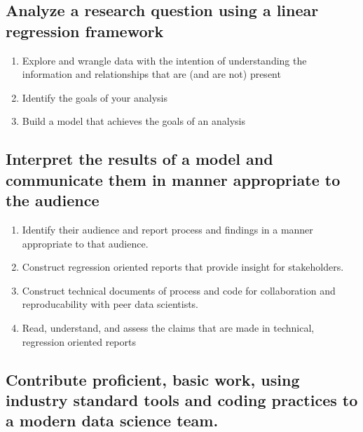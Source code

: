 \documentclass[
]{book}
\providecommand{\tightlist}{%
  \setlength{\itemsep}{0pt}\setlength{\parskip}{0pt}}
\theoremstyle{definition}
\theoremstyle{definition}
\theoremstyle{definition}
\theoremstyle{definition}
\theoremstyle{remark}
\begin{document}
\hypertarget{analyze-a-research-question-using-a-linear-regression-framework}{%
\subsection{Analyze a research question using a linear regression framework}\label{analyze-a-research-question-using-a-linear-regression-framework}}

\begin{enumerate}
\def\labelenumi{\arabic{enumi}.}
\tightlist
\item
  Explore and wrangle data with the intention of understanding the information and relationships that are (and are not) present
\item
  Identify the goals of your analysis
\item
  Build a model that achieves the goals of an analysis
\end{enumerate}

\hypertarget{interpret-the-results-of-a-model-and-communicate-them-in-manner-appropriate-to-the-audience}{%
\subsection{Interpret the results of a model and communicate them in manner appropriate to the audience}\label{interpret-the-results-of-a-model-and-communicate-them-in-manner-appropriate-to-the-audience}}

\begin{enumerate}
\def\labelenumi{\arabic{enumi}.}
\tightlist
\item
  Identify their audience and report process and findings in a manner appropriate to that audience.
\item
  Construct regression oriented reports that provide insight for stakeholders.
\item
  Construct technical documents of process and code for collaboration and reproducability with peer data scientists.
\item
  Read, understand, and assess the claims that are made in technical, regression oriented reports
\end{enumerate}

\hypertarget{contribute-proficient-basic-work-using-industry-standard-tools-and-coding-practices-to-a-modern-data-science-team.}{%
\subsection{Contribute proficient, basic work, using industry standard tools and coding practices to a modern data science team.}\label{contribute-proficient-basic-work-using-industry-standard-tools-and-coding-practices-to-a-modern-data-science-team.}}
\end{document}
